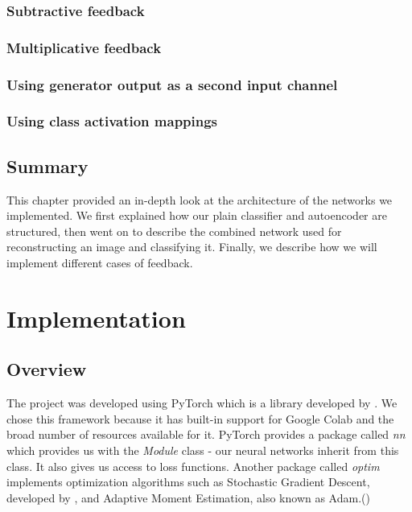 \documentclass{l4proj}
\begin{document}
\subsection{Subtractive feedback}
\subsection{Multiplicative feedback}
\subsection{Using generator output as a second input channel}
\subsection{Using class activation mappings}
\section{Summary}
This chapter provided an in-depth look at the architecture of the networks we implemented. We first explained how our plain classifier and autoencoder are structured, then went on to describe the combined network used for reconstructing an image and classifying it. Finally, we describe how we will implement different cases of feedback.


\chapter{Implementation}
\label{chap:implementation}
\section{Overview}
The project was developed using PyTorch which is a library developed by \cite{pytorch}. We chose this framework because it has built-in support for Google Colab and the broad number of resources available for it. PyTorch provides a package called \textit{nn} which provides us with the \textit{Module} class - our neural networks inherit from this class. It also gives us access to loss functions. Another package called \textit{optim} implements optimization algorithms such as Stochastic Gradient Descent, developed by \cite{SGD}, and Adaptive Moment Estimation, also known as Adam.(\cite{adam})
\end{document}
